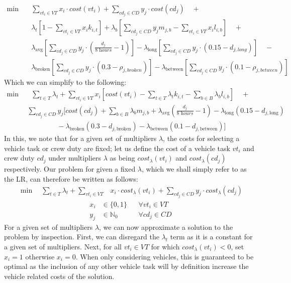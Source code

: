 \documentclass[]{article}
\begin{document}
\begin{align}
\min \quad
& \sum_{vt_i \in VT} x_{i} \cdot cost(vt_i) + \sum_{cd_j \in CD} y_{j} \cdot cost(cd_j)\quad+ \nonumber \\ 
&\lambda_{t} [1 - \sum_{vt_i \in VT} x_{i}k_{i,t}] + \lambda_{b} [\sum_{cd_j \in CD}y_j m_{j,b} - \sum_{vt_i \in VT}x_i l_{i,b}] \quad+\nonumber \\
&\lambda_{\text{avg}} [\sum_{cd_j \in \textit{CD}} y_{j} \cdot (\frac{d_{j}}{\textit{8 hours}} - 1)] -\lambda_{\text{long}} [\sum_{cd_j \in \textit{CD}} y_{j} \cdot (0.15 - d_{j,\textit{long}})]\quad- \nonumber \\
&\lambda_{\text{broken}}[\sum_{cd_j \in \textit{CD}} y_{j} \cdot (0.3 - \rho_{j,\textit{broken}})] -\lambda_{\text{between}} [\sum_{cd_j \in \textit{CD}} y_{j} \cdot (0.1 - \rho_{j,\textit{between}})] \nonumber
\end{align}
Which we can simplify to the following:
\begin{align}
\min& \quad  \sum_{t \in T} \lambda_{t} + \sum_{vt_i \in VT} x_{i} [cost(vt_i) -\sum_{t \in T} \lambda_{t} k_{i,t} - \sum_{b \in B} \lambda_{b} l_{i,b}]\quad+ \nonumber \\
 &\:\:\sum_{cd_j \in \textit{CD}} y_{j} [cost(cd_j) + \sum_{b \in B} \lambda_{b} m_{j,b} + \lambda_{\text{avg}} (\frac{d_{j}}{\textit{8 hours}} - 1) - \lambda_{\text{long}} (0.15 - d_{j,\text{long}}) \nonumber \\
&\quad\quad\quad\quad\:\:\:-\lambda_{\text{broken}} (0.3 - d_{j,\text{broken}}) - \lambda_{\text{between}} (0.1 - d_{j,\text{between}})] \quad \nonumber
\end{align}
In this, we note that for a given set of multipliers $\lambda$, the costs for selecting a vehicle task or crew duty are fixed; let us define the cost of a vehicle task $vt_i$ and crew duty $cd_j$ under multipliers $\lambda$ as being $cost_\lambda(vt_i)$ and $cost_\lambda(cd_j)$ respectively. Our problem for given a fixed $\lambda$, which we shall simply refer to as the LR, can therefore be written as follows:
\begin{align}
\min \quad \sum_{t \in T} \lambda_{t} + \sum_{vt_i \in VT}& x_{i} \cdot cost_\lambda(vt_i) + \sum_{cd_j \in CD} y_{j} \cdot cost_\lambda(cd_j)
\end{align}
\begin{align}
x_{i} &\in \{ 0, 1 \} && \forall vt_i \in VT \\
 y_{j} &\in \mathbb{N}_0 && \forall cd_j \in CD
\end{align}
For a given set of multipliers $\lambda$, we can now approximate a solution to the problem by inspection. First, we can disregard the $\lambda_t$ term as it is a constant for a given set of multipliers. Next, for all $vt_i \in VT$ for which $cost_\lambda(vt_i) < 0$, set $x_i = 1$ otherwise $x_i = 0$. When only considering vehicles, this is guaranteed to be optimal as the inclusion of any other vehicle task will by definition increase the vehicle related costs of the solution. 
\end{document}
